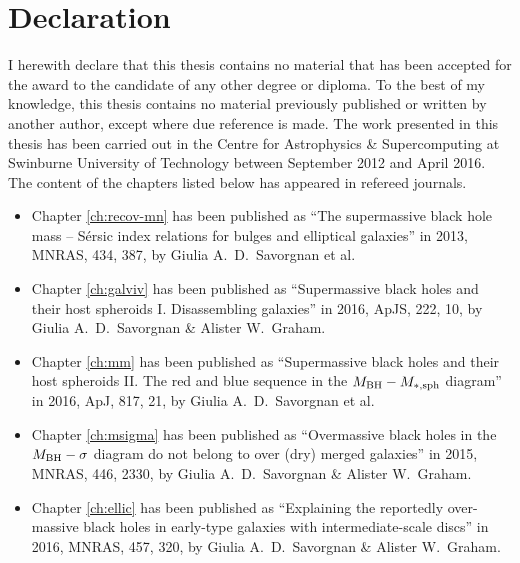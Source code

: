 \chapter*{Declaration}

I herewith declare that this thesis contains no material that has been accepted 
for the award to the candidate of any other degree or diploma. 
To the best of my knowledge, 
this thesis contains no material previously published or written by another author, 
except where due reference is made.
The work presented in this thesis has been carried out 
in the Centre for Astrophysics \& Supercomputing 
at Swinburne University of Technology between September 2012 and April 2016. 
The content of the chapters listed below has appeared in refereed journals. 

\begin{itemize}

\item Chapter \ref{ch:recov-mn} has been published as 
``The supermassive black hole mass -- S\'ersic index relations for bulges and elliptical galaxies''
in 2013, MNRAS, 434, 387, by Giulia A.~D.~Savorgnan et al.

\item Chapter \ref{ch:galviv} has been published as 
``Supermassive black holes and their host spheroids I. Disassembling galaxies'' 
in 2016, ApJS, 222, 10, by Giulia A.~D.~Savorgnan \& Alister W.~Graham. 

\item Chapter \ref{ch:mm} has been published as 
``Supermassive black holes and their host spheroids 
II. The red and blue sequence in the $M_{\rm BH} - M_{\rm *,sph}$ diagram''
in 2016, ApJ, 817, 21, by Giulia A.~D.~Savorgnan et al.

\item Chapter \ref{ch:msigma} has been published as 
``Overmassive black holes in the $M_{\rm BH} - \sigma$ diagram do not belong to over (dry) merged galaxies''
in 2015, MNRAS, 446, 2330, by Giulia A.~D.~Savorgnan \& Alister W.~Graham. 

\item Chapter \ref{ch:ellic} has been published as 
``Explaining the reportedly over-massive black holes in early-type galaxies with intermediate-scale discs'' 
in 2016, MNRAS, 457, 320, by Giulia A.~D.~Savorgnan \& Alister W.~Graham. 

\end{itemize}

